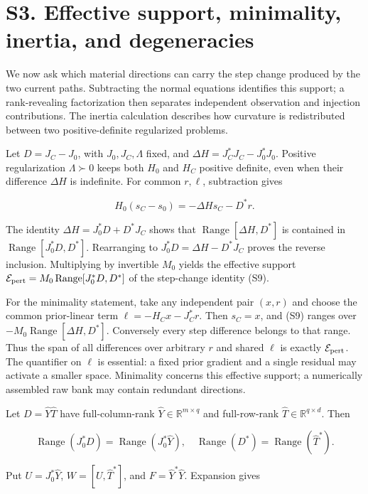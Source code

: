 \documentclass[11pt]{article}
\begin{document}
\section*{S3. Effective support, minimality, inertia, and degeneracies}

We now ask which material directions can carry the step change produced by the two current paths. Subtracting the normal equations identifies this support; a rank-revealing factorization then separates independent observation and injection contributions. The inertia calculation describes how curvature is redistributed between two positive-definite regularized problems.

Let \(D=J_C-J_0\), with \(J_0,J_C,\Lambda\) fixed, and \(\Delta H=J_C^*J_C-J_0^*J_0\). Positive regularization \(\Lambda\succ0\) keeps both \(H_0\) and \(H_C\) positive definite, even when their difference \(\Delta H\) is indefinite. For common \(r,\ell\), subtraction gives

\[
H_0(s_C-s_0)=-\Delta Hs_C-D^*r. \tag{S9}
\]

The identity \(\Delta H=J_0^*D+D^*J_C\) shows that \(\operatorname{Range}[\Delta H,D^*]\) is contained in \(\operatorname{Range}[J_0^*D,D^*]\). Rearranging to \(J_0^*D=\Delta H-D^*J_C\) proves the reverse inclusion. Multiplying by invertible \(M_0\) yields the effective support \(\mathcal E_{\rm pert}=M_0\operatorname{Range}[J_0^*D,D^*]\) of the step-change identity (S9).

For the minimality statement, take any independent pair \((x,r)\) and choose the common prior-linear term \(\ell=-H_Cx-J_C^*r\). Then \(s_C=x\), and (S9) ranges over \(-M_0\operatorname{Range}[\Delta H,D^*]\). Conversely every step difference belongs to that range. Thus the span of all differences over arbitrary \(r\) and shared \(\ell\) is exactly \(\mathcal E_{\rm pert}\). The quantifier on \(\ell\) is essential: a fixed prior gradient and a single residual may activate a smaller space. Minimality concerns this effective support; a numerically assembled raw bank may contain redundant directions.

Let \(D=\widehat Y\widehat T\) have full-column-rank \(\widehat Y\in\mathbb R^{m\times q}\) and full-row-rank \(\widehat T\in\mathbb R^{q\times d}\). Then

\[
\operatorname{Range}(J_0^*D)=\operatorname{Range}(J_0^*\widehat Y),\quad
\operatorname{Range}(D^*)=\operatorname{Range}(\widehat T^*).
\]

Put \(U=J_0^*\widehat Y\), \(W=[U,\widehat T^*]\), and \(F=\widehat Y^*\widehat Y\). Expansion gives
\end{document}
